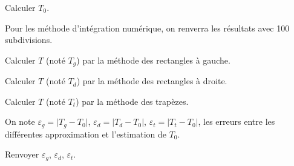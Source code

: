 \question{} Calculer $T_0$.

Pour les méthode d'intégration numérique, on renverra les résultats avec 100 subdivisions.

\question{} Calculer $T$ (noté $T_{g}$) par la méthode des rectangles à gauche.

\question{} Calculer $T$ (noté $T_{d}$) par la méthode des rectangles à droite.

\question{} Calculer $T$ (noté $T_{t}$) par la méthode des trapèzes.

On note $\varepsilon_g=\vert T_g-T_0\vert$,  $\varepsilon_d=\vert T_d-T_0\vert$,  $\varepsilon_t=\vert T_t-T_0\vert$, les erreurs entre les différentes approximation et l'estimation de $T_0$.

\question{} Renvoyer $\varepsilon_g$,  $\varepsilon_d$,  $\varepsilon_t$.


